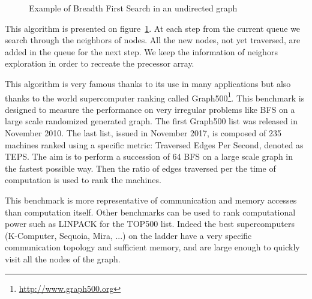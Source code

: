 \begin{figure}[t!]
\caption{Example of Breadth First Search in an undirected graph}
\label{fig:part2_chap3:BFS}
\end{figure}


This algorithm is presented on figure~\ref{fig:part2_chap3:BFS}.
At each step from the current queue we search through the neighbors of nodes. 
All the new nodes, not yet traversed, are added in the queue for the next step.
We keep the information of neighors exploration in order to recreate the precessor array. 

This algorithm is very famous thanks to its use in many applications but also thanks to the world supercomputer ranking called Graph500\footnote{\url{http://www.graph500.org}}.
This benchmark is designed to measure the performance on very irregular problems like BFS on a large scale randomized generated graph. 
The first Graph500 list was released in November 2010.
The last list, issued in November 2017, is composed of 235 machines ranked using a specific metric: Traversed Edges Per Second, denoted as TEPS. 
The aim is to perform a succession of 64 BFS on a large scale graph in the fastest possible way.
Then the ratio of edges traversed per the time of computation is used to rank the machines.

This benchmark is more representative of communication and memory accesses than computation itself. 
Other benchmarks can be used to rank computational power such as LINPACK for the TOP500 list.
Indeed the best supercomputers (K-Computer, Sequoia, Mira, ...) on the ladder have a very specific communication topology and sufficient memory, and are large enough to quickly visit all the nodes of the graph. 

